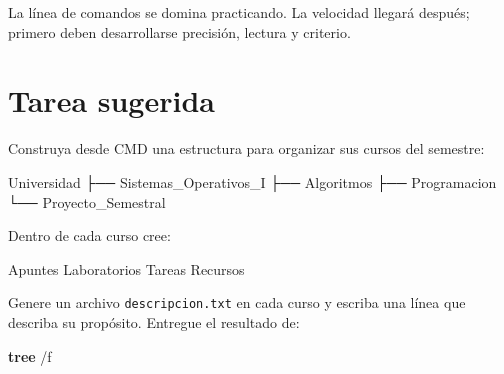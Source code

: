 \documentclass[
  spanish,
  letterpaper,
]{scrbook}
\newenvironment{Shaded}{\begin{snugshade}}{\end{snugshade}}
\newcommand{\AttributeTok}[1]{\textcolor[rgb]{0.40,0.45,0.13}{#1}}
\newcommand{\KeywordTok}[1]{\textcolor[rgb]{0.00,0.23,0.31}{\textbf{#1}}}
\newcommand{\NormalTok}[1]{\textcolor[rgb]{0.00,0.23,0.31}{#1}}
\begin{document}
\begin{tcolorbox}[enhanced jigsaw, arc=.35mm, bottomrule=.15mm, bottomtitle=1mm, breakable, colback=white, colbacktitle=quarto-callout-tip-color!10!white, colframe=quarto-callout-tip-color-frame, coltitle=black, left=2mm, leftrule=.75mm, opacityback=0, opacitybacktitle=0.6, rightrule=.15mm, title=\textcolor{quarto-callout-tip-color}{\faLightbulb}\hspace{0.5em}{Consejo final del Ingeniero}, titlerule=0mm, toprule=.15mm, toptitle=1mm]

La línea de comandos se domina practicando. La velocidad llegará
después; primero deben desarrollarse precisión, lectura y criterio.

\end{tcolorbox}


\chapter{Tarea sugerida}\label{tarea-sugerida-1}

Construya desde CMD una estructura para organizar sus cursos del
semestre:

\begin{Shaded}
\begin{Highlighting}[]
\NormalTok{Universidad}
\NormalTok{├── Sistemas\_Operativos\_I}
\NormalTok{├── Algoritmos}
\NormalTok{├── Programacion}
\NormalTok{└── Proyecto\_Semestral}
\end{Highlighting}
\end{Shaded}

Dentro de cada curso cree:

\begin{Shaded}
\begin{Highlighting}[]
\NormalTok{Apuntes}
\NormalTok{Laboratorios}
\NormalTok{Tareas}
\NormalTok{Recursos}
\end{Highlighting}
\end{Shaded}

Genere un archivo \texttt{descripcion.txt} en cada curso y escriba una
línea que describa su propósito. Entregue el resultado de:

\begin{Shaded}
\begin{Highlighting}[]
\KeywordTok{tree} \AttributeTok{/f}
\end{Highlighting}
\end{Shaded}

\end{document}
